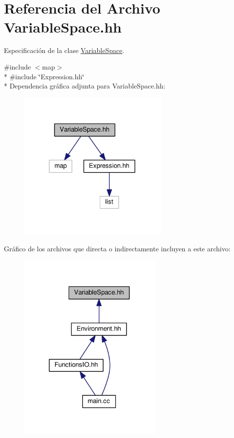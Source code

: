 \hypertarget{_variable_space_8hh}{}\section{Referencia del Archivo Variable\+Space.\+hh}
\label{_variable_space_8hh}


Especificación de la clase \hyperlink{class_variable_space}{Variable\+Space}.  


{\ttfamily \#include $<$map$>$}\\*
{\ttfamily \#include \char`\"{}Expression.\+hh\char`\"{}}\\*
Dependencia gráfica adjunta para Variable\+Space.\+hh\+:
\nopagebreak
\begin{figure}[H]
\begin{center}
\leavevmode
\includegraphics[width=212pt]{_variable_space_8hh__incl}
\end{center}
\end{figure}
Gráfico de los archivos que directa o indirectamente incluyen a este archivo\+:
\nopagebreak
\begin{figure}[H]
\begin{center}
\leavevmode
\includegraphics[width=203pt]{_variable_space_8hh__dep__incl}
\end{center}
\end{figure}
